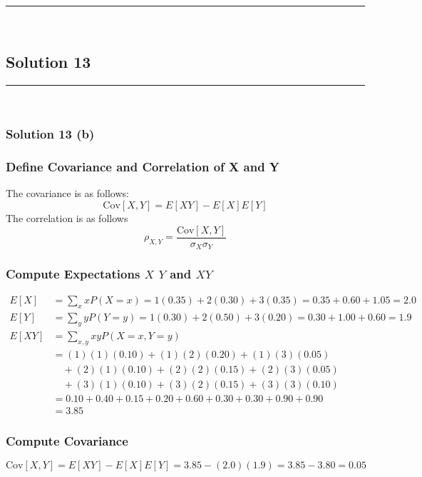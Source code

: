 \documentclass{article}
\begin{document}
\noindent\rule{\textwidth}{0.4pt}\\

\newpage
\subsection*{Solution 13}
\noindent\rule{\textwidth}{0.4pt}\\
\subsubsection*{Solution  13 (b)}

\subsubsection*{Define Covariance and Correlation of X and Y}
\parbox{\textwidth}{
The covariance is as follows:
$$\text{Cov}[X, Y] = E[XY] - E[X]E[Y]$$
The correlation is as follows
$$\rho_{X, Y} = \frac{\text{Cov}[X, Y]}{\sigma_X \sigma_Y}$$
}

\subsubsection*{Compute Expectations $X$ $Y$ and $XY$}

\begin{align*}
  E[X] &= \sum_{x} x P(X=x) = 1(0.35) + 2(0.30) + 3(0.35) = 0.35 + 0.60 + 1.05 = 2.0 \\
  E[Y] &= \sum_{y} y P(Y=y) = 1(0.30) + 2(0.50) + 3(0.20) = 0.30 + 1.00 + 0.60 = 1.9 \\
    E[XY] &= \sum_{x,y} xy P(X=x, Y=y) \\
          &= (1)(1)(0.10) + (1)(2)(0.20) + (1)(3)(0.05) \\
          &\quad + (2)(1)(0.10) + (2)(2)(0.15) + (2)(3)(0.05) \\
          &\quad + (3)(1)(0.10) + (3)(2)(0.15) + (3)(3)(0.10) \\
          &= 0.10 + 0.40 + 0.15 + 0.20 + 0.60 + 0.30 + 0.30 + 0.90 + 0.90 \\
          &= 3.85
\end{align*}

\subsubsection*{Compute Covariance}
$$\text{Cov}[X, Y] = E[XY] - E[X]E[Y] = 3.85 - (2.0)(1.9) = 3.85 - 3.80 = 0.05$$
\end{document}
